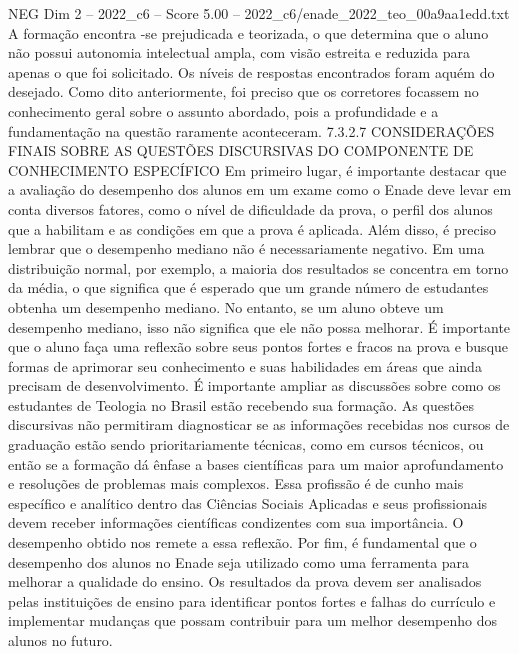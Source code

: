 \begin{textsample}{NEG Dim 2 – 2022\_c6 – Score 5.00 – 2022\_c6/enade\_2022\_teo\_00a9aa1edd.txt}
A formação encontra -se prejudicada e teorizada, o que determina que o aluno não possui autonomia intelectual ampla, com visão estreita e reduzida para apenas o que foi solicitado.
Os níveis de respostas encontrados foram aquém do desejado.
Como dito anteriormente, foi preciso que os corretores focassem no conhecimento geral sobre o assunto abordado, pois a profundidade e a fundamentação na questão raramente aconteceram. 7.3.2.7 CONSIDERAÇÕES FINAIS SOBRE AS QUESTÕES DISCURSIVAS DO COMPONENTE DE CONHECIMENTO ESPECÍFICO Em primeiro lugar, é importante destacar que a avaliação do desempenho dos alunos em um exame como o Enade deve levar em conta diversos fatores, como o nível de dificuldade da prova, o perfil dos alunos que a habilitam e as condições em que a prova é aplicada.
Além disso, é preciso lembrar que o desempenho mediano não é necessariamente negativo.
Em uma distribuição normal, por exemplo, a maioria dos resultados se concentra em torno da média, o que significa que é esperado que um grande número de estudantes obtenha um desempenho mediano.
No entanto, se um aluno obteve um desempenho mediano, isso não significa que ele não possa melhorar.
É importante que o aluno faça uma reflexão sobre seus pontos fortes e fracos na prova e busque formas de aprimorar seu conhecimento e suas habilidades em áreas que ainda precisam de desenvolvimento.
É importante ampliar as discussões sobre como os estudantes de Teologia no Brasil estão recebendo sua formação.
As questões discursivas não permitiram diagnosticar se as informações recebidas nos cursos de graduação estão sendo prioritariamente técnicas, como em cursos técnicos, ou então se a formação dá ênfase a bases científicas para um maior aprofundamento e resoluções de problemas mais complexos.
Essa profissão é de cunho mais específico e analítico dentro das Ciências Sociais Aplicadas e seus profissionais devem receber informações científicas condizentes com sua importância.
O desempenho obtido nos remete a essa reflexão.
Por fim, é fundamental que o desempenho dos alunos no Enade seja utilizado como uma ferramenta para melhorar a qualidade do ensino.
Os resultados da prova devem ser analisados pelas instituições de ensino para identificar pontos fortes e falhas do currículo e implementar mudanças que possam contribuir para um melhor desempenho dos alunos no futuro.

\end{textsample}
